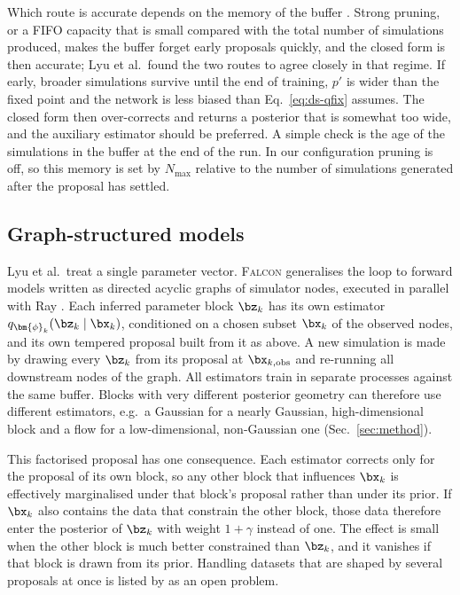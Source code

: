 Which route is accurate depends on the memory of the buffer
\citep{lyu_dynamic_2026}. Strong pruning, or a FIFO capacity that is small
compared with the total number of simulations produced, makes the buffer
forget early proposals quickly, and the closed form is then accurate; Lyu et
al.\ found the two routes to agree closely in that regime. If early, broader
simulations survive until the end of training, $p'$ is wider than the fixed
point and the network is less biased than Eq.~\eqref{eq:ds-qfix} assumes.
The closed form then over-corrects and returns a posterior that is somewhat
too wide, and the auxiliary estimator should be preferred. A simple check is
the age of the simulations in the buffer at the end of the run. In our
configuration pruning is off, so this memory is set by $N_{\max}$ relative to
the number of simulations generated after the proposal has settled.

\subsection{Graph-structured models}
\label{sec:ds-graph}

Lyu et al.\ treat a single parameter vector. \textsc{Falcon} generalises the
loop to forward models written as directed acyclic graphs of simulator nodes,
executed in parallel with Ray \citep{moritz_ray_2018}. Each inferred parameter
block $\bz_k$ has its own estimator $q_{\bm{\phi}_k}(\bz_k\mid\bx_k)$,
conditioned on a chosen subset $\bx_k$ of the observed nodes, and its own
tempered proposal built from it as above. A new simulation is made by drawing
every $\bz_k$ from its proposal at $\bx_{k,\mathrm{obs}}$ and re-running all
downstream nodes of the graph. All estimators train in separate processes
against the same buffer. Blocks with very different posterior geometry can
therefore use different estimators, e.g.\ a Gaussian for a nearly Gaussian,
high-dimensional block and a flow for a low-dimensional, non-Gaussian one
(Sec.~\ref{sec:method}).

This factorised proposal has one consequence. Each estimator corrects only
for the proposal of its own block, so any other block that influences
$\bx_k$ is effectively marginalised under that block's proposal rather than
under its prior. If $\bx_k$ also contains the data that constrain the other
block, those data therefore enter the posterior of $\bz_k$ with weight
$1+\gamma$ instead of one. The effect is small when the other block is much
better constrained than $\bz_k$, and it vanishes if that block is drawn from
its prior. Handling datasets that are shaped by several proposals at once is
listed by \citet{lyu_dynamic_2026} as an open problem.


